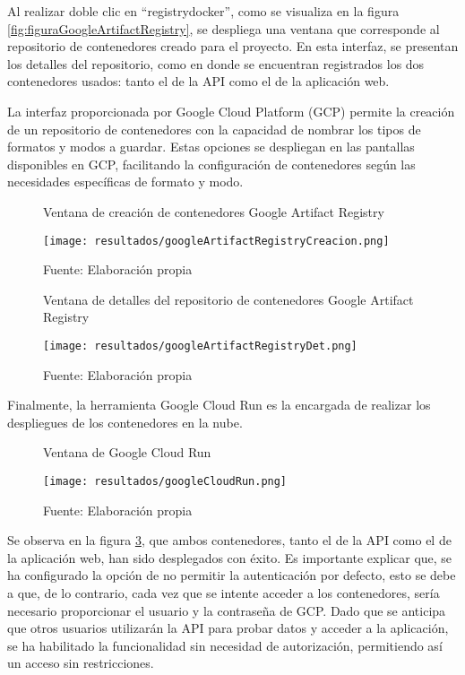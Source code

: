Al realizar doble clic en ``registrydocker'', como se visualiza en la figura \ref{fig:figuraGoogleArtifactRegistry}, se despliega una ventana que corresponde al repositorio de contenedores creado para el proyecto. En esta interfaz, se presentan los detalles del repositorio, como en donde se encuentran registrados los dos contenedores usados: tanto el de la API como el de la aplicación web. \newline

La interfaz proporcionada por Google Cloud Platform (GCP) permite la creación de un repositorio de contenedores con la capacidad de nombrar los tipos de formatos y modos a guardar. Estas opciones se despliegan en las pantallas disponibles en GCP, facilitando la configuración de contenedores según las necesidades específicas de formato y modo.

\newpage

\begin{figure}[h]
	\centering
	\caption{Ventana de creación de contenedores Google Artifact Registry}
	\texttt{[image: resultados/googleArtifactRegistryCreacion.png]}
	\caption*{\footnotesize Fuente: Elaboración propia}
	\label{fig:figuraGoogleArtifactRegistryCreacion}
\end{figure}

\newpage

\begin{figure}[h]
	\centering
	\caption{Ventana de detalles del repositorio de contenedores Google Artifact Registry}
	\texttt{[image: resultados/googleArtifactRegistryDet.png]}
	\caption*{\footnotesize Fuente: Elaboración propia}
	\label{fig:figuraGoogleArtifactRegistryDet}
\end{figure}

Finalmente, la herramienta Google Cloud Run es la encargada de realizar los despliegues de los contenedores en la nube.

\newpage

\begin{figure}[h]
	\centering
	\caption{Ventana de Google Cloud Run}
	\texttt{[image: resultados/googleCloudRun.png]}
	\caption*{\footnotesize Fuente: Elaboración propia}
	\label{fig:figuraGoogleCloudRun}
\end{figure}

Se observa en la figura \ref{fig:figuraGoogleCloudRun}, que ambos contenedores, tanto el de la API como el de la aplicación web, han sido desplegados con éxito. Es importante explicar que, se ha configurado la opción de no permitir la autenticación por defecto, esto se debe a que, de lo contrario, cada vez que se intente acceder a los contenedores, sería necesario proporcionar el usuario y la contraseña de GCP. Dado que se anticipa que otros usuarios utilizarán la API para probar datos y acceder a la aplicación, se ha habilitado la funcionalidad sin necesidad de autorización, permitiendo así un acceso sin restricciones. \newline

